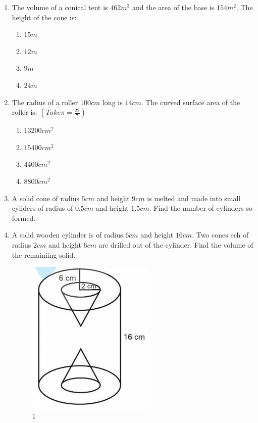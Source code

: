 \documentclass{article}
\begin{document}
 \begin{enumerate}
	 \item The volume of a conical tent is $462 m^{3}$ and the area of the base is $154 m^{2}$. The height of the cone is:
		 \begin{enumerate}
			 \item $15 m$
			 \item $12 m$
			 \item $9 m$
			 \item $24 m$
		 \end{enumerate}
	 \item The radius of a roller $100 cm$ long is $14 cm$. The curved surface area of the roller is: $(Take \pi = \frac{22}{7})$
		 \begin{enumerate}
			 \item $13200 cm^{2}$
			 \item $15400 cm^{2}$
			 \item $4400 cm^{2}$
			 \item $8800 cm^{2}$
		 \end{enumerate}
	 \item A solid cone of radius $5 cm$ and height $9 cm$ is melted and made into small cyliders of radius of $0.5 cm$ and height $1.5 cm$. Find the number of cylinders so formed.
	 \item A solid wooden cylinder is of radius $6 cm$ and height $16 cm$. Two cones ech of radius $2 cm$ and height $6 cm$ are drilled out of the cylinder. Find the volume of the remainiing solid.\\
		 \begin{figure}[h]
			 \centering
			 \includegraphics[width=60mm]{figs/img1.jpg}
			 \caption{1}
			 \label{Figure}
		 \end{figure}
 \end{enumerate}
 
\end{document}
